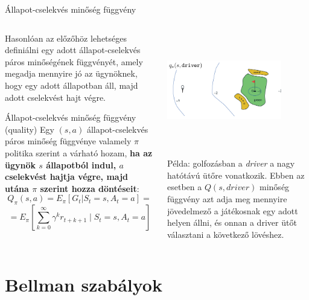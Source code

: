 \documentclass[english, aspectratio=169]{beamer}
\makeatletter
\let\origtableofcontents=\tableofcontents
\def\tableofcontents{\@ifnextchar[{\origtableofcontents}{\gobbletableofcontents}}
\def\gobbletableofcontents#1{\origtableofcontents}
\makeatother
\begin{document}
\begin{frame}{Állapot-cselekvés minőség függvény}
\begin{columns}
\begin{column}{.62\textwidth}
Hasonlóan az előzőhöz lehetséges definiálni egy adott állapot-cselekvés páros minőségének függvényét, amely megadja mennyire jó az ügynöknek, hogy egy adott állapotban áll, majd adott cselekvést hajt végre.
\begin{block}{Állapot-cselekvés minőség függvény (quality)}
Egy $(s,a)$ állapot-cselekvés páros minőség függvénye valamely $\pi$ politika szerint a várható hozam, \textbf{ha az ügynök $s$ állapotból indul, $a$ cselekvést hajtja végre, majd utána $\pi$ szerint hozza döntéseit}:\\
\[
Q_{\pi}(s,a)=E_{\pi}\left[G_{t}|S_{t}=s,A_{t}=a\right]=
\]
\[
=E_{\pi}\left[\sum_{k=0}^{\infty}\gamma^{k}r_{t+k+1}\mid S_{t}=s,A_{t}=a\right]
\]
\end{block}
\end{column}
\begin{column}{.4\textwidth}
\begin{center}
\includegraphics[width=5cm, height=5cm, keepaspectratio]{images/reinf_10.png}
\end{center}
\begin{small}
Példa: golfozásban a \emph{driver} a nagy  hatótávú ütőre vonatkozik. Ebben az esetben a $Q(s, driver)$ minőség függvény azt adja meg mennyire jövedelmező a játékosnak egy adott helyen állni, és onnan a driver ütőt választani a következő lövéshez.
\end{small}
\end{column}
\end{columns}
\end{frame}

\section{Bellman szabályok}

\begin{frame}
\tableofcontents[currentsection]
\end{frame}
\end{document}
